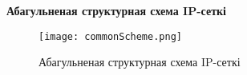 \vspace{-0.8\baselineskip}
\begin{center}
    \textbf{Абагульненая структурная схема IP-сеткі}
\end{center}

\vspace{-\baselineskip}
\begin{figure}[h!]
    \renewcommand{\thefigure}{A.1}
    \centering
    \texttt{[image: commonScheme.png]}
    \vspace{-\baselineskip}
    \caption{Абагульненая структурная схема IP-сеткі}
    \label{figure: Common Scheme}
\end{figure}
